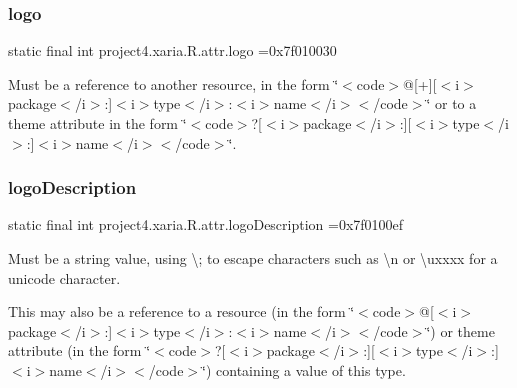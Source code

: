 \subsubsection{\texorpdfstring{logo}{logo}}
{\footnotesize\ttfamily static final int project4.\+xaria.\+R.\+attr.\+logo =0x7f010030\hspace{0.3cm}{\ttfamily [static]}}

Must be a reference to another resource, in the form \char`\"{}$<$code$>$@\mbox{[}+\mbox{]}\mbox{[}$<$i$>$package$<$/i$>$\+:\mbox{]}$<$i$>$type$<$/i$>$\+:$<$i$>$name$<$/i$>$$<$/code$>$\char`\"{} or to a theme attribute in the form \char`\"{}$<$code$>$?\mbox{[}$<$i$>$package$<$/i$>$\+:\mbox{]}\mbox{[}$<$i$>$type$<$/i$>$\+:\mbox{]}$<$i$>$name$<$/i$>$$<$/code$>$\char`\"{}. \mbox{\label{classproject4_1_1xaria_1_1R_1_1attr_a4609e2eefed62f039512caaee341b8ce}} 
\subsubsection{\texorpdfstring{logo\+Description}{logoDescription}}
{\footnotesize\ttfamily static final int project4.\+xaria.\+R.\+attr.\+logo\+Description =0x7f0100ef\hspace{0.3cm}{\ttfamily [static]}}

Must be a string value, using \textquotesingle{}\textbackslash{};\textquotesingle{} to escape characters such as \textquotesingle{}\textbackslash{}n\textquotesingle{} or \textquotesingle{}\textbackslash{}uxxxx\textquotesingle{} for a unicode character. 

This may also be a reference to a resource (in the form \char`\"{}$<$code$>$@\mbox{[}$<$i$>$package$<$/i$>$\+:\mbox{]}$<$i$>$type$<$/i$>$\+:$<$i$>$name$<$/i$>$$<$/code$>$\char`\"{}) or theme attribute (in the form \char`\"{}$<$code$>$?\mbox{[}$<$i$>$package$<$/i$>$\+:\mbox{]}\mbox{[}$<$i$>$type$<$/i$>$\+:\mbox{]}$<$i$>$name$<$/i$>$$<$/code$>$\char`\"{}) containing a value of this type. \mbox{\label{classproject4_1_1xaria_1_1R_1_1attr_a9dc6bc2417f821003beb6d68273b0654}} 
